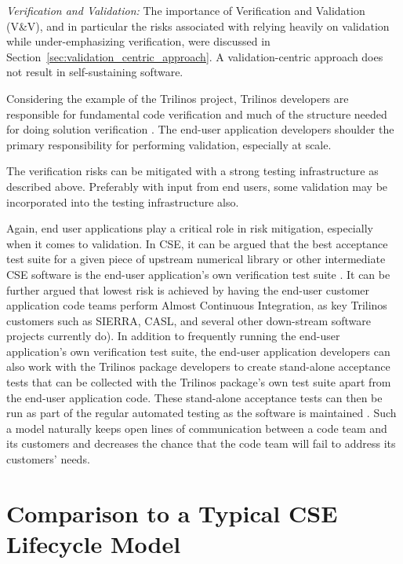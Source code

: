 \documentclass[11pt]{SANDreport}
\begin{document}
\textit{Verification and Validation:} The importance of Verification and
Validation (V\&V), and in particular the risks associated with relying heavily
on validation while under-emphasizing verification, were discussed in
Section~\ref{sec:validation_centric_approach}.  A validation-centric
approach does not result in self-sustaining software.

Considering the example of the Trilinos project, Trilinos developers are
responsible for fundamental code verification and much of the
structure needed for doing solution verification
{}\cite{SEVVIntersections05}.  The end-user application
developers shoulder the primary responsibility for performing validation,
especially at scale.

The verification risks can be mitigated with a strong testing
infrastructure as described above.  Preferably with input from end users, some
validation may be incorporated into the testing infrastructure also.

Again, end user applications play a critical role in risk mitigation,
especially when it comes to validation.  In CSE, it can be
argued that the best acceptance test suite for a given piece of
upstream numerical library or other intermediate CSE software is the
end-user application's own verification test suite
{}\cite{SoftwareIntegrationforCSE09}.  It can be further argued that
lowest risk is achieved by having the end-user customer application
code teams perform Almost Continuous Integration, as key Trilinos customers
such as SIERRA, CASL, and several other down-stream software projects
currently do{}\cite{SoftwareIntegrationforCSE09}).  In addition
to frequently running the end-user application's own verification test
suite, the end-user application developers can also work with the
Trilinos package developers to create stand-alone acceptance tests
that can be collected with the Trilinos package's own test suite apart
from the end-user application code.  These stand-alone acceptance
tests can then be run as part of the regular automated testing as the
software is maintained {}\cite{DomainDrivenDesign}.  Such a model naturally
keeps open lines of communication between a code team and its customers and
decreases the chance that the code team will fail to address its customers'
needs.

%
\section{Comparison to a Typical CSE Lifecycle Model}
\label{sec:compare_with_typical_CSE_model}
%
\end{document}
